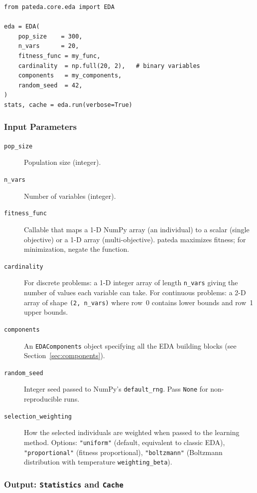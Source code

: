 \documentclass[a4paper,11pt]{article}
\begin{document}
\begin{lstlisting}
from pateda.core.eda import EDA

eda = EDA(
    pop_size    = 300,
    n_vars      = 20,
    fitness_func = my_func,
    cardinality  = np.full(20, 2),   # binary variables
    components   = my_components,
    random_seed  = 42,
)
stats, cache = eda.run(verbose=True)
\end{lstlisting}

\subsubsection{Input Parameters}

\begin{description}
  \item[\texttt{pop\_size}] Population size (integer).
  \item[\texttt{n\_vars}] Number of variables (integer).
  \item[\texttt{fitness\_func}] Callable that maps a 1-D NumPy array (an
    individual) to a scalar (single objective) or a 1-D array (multi-objective).
    pateda maximizes fitness; for minimization, negate the function.
  \item[\texttt{cardinality}] For discrete problems: a 1-D integer array of
    length \texttt{n\_vars} giving the number of values each variable can take.
    For continuous problems: a 2-D array of shape
    \texttt{(2, n\_vars)} where row~0 contains lower bounds and row~1 upper bounds.
  \item[\texttt{components}] An \texttt{EDAComponents} object specifying all
    the EDA building blocks (see Section~\ref{sec:components}).
  \item[\texttt{random\_seed}] Integer seed passed to NumPy's
    \texttt{default\_rng}.  Pass \texttt{None} for non-reproducible runs.
  \item[\texttt{selection\_weighting}] How the selected individuals are weighted
    when passed to the learning method.  Options: \texttt{"uniform"} (default,
    equivalent to classic EDA), \texttt{"proportional"} (fitness proportional),
    \texttt{"boltzmann"} (Boltzmann distribution with temperature
    \texttt{weighting\_beta}).
\end{description}

\subsubsection{Output: \texttt{Statistics} and \texttt{Cache}}
\end{document}
